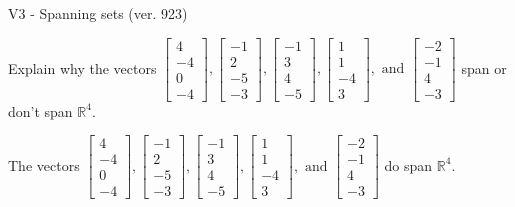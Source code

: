 \begin{exercise}
  \begin{exerciseTitle}V3 - Spanning sets (ver. 923)\end{exerciseTitle}
  \begin{exerciseStatement}
    Explain why the vectors \(\left[\begin{array}{r}
4 \\
-4 \\
0 \\
-4
\end{array}\right] , \left[\begin{array}{r}
-1 \\
2 \\
-5 \\
-3
\end{array}\right] , \left[\begin{array}{r}
-1 \\
3 \\
4 \\
-5
\end{array}\right] , \left[\begin{array}{r}
1 \\
1 \\
-4 \\
3
\end{array}\right] , \text{ and } \left[\begin{array}{r}
-2 \\
-1 \\
4 \\
-3
\end{array}\right]\) span or don't span \(\mathbb{R}^4\). 
	


  \end{exerciseStatement}
  \begin{exerciseAnswer}
   The vectors \(\left[\begin{array}{r}
4 \\
-4 \\
0 \\
-4
\end{array}\right] , \left[\begin{array}{r}
-1 \\
2 \\
-5 \\
-3
\end{array}\right] , \left[\begin{array}{r}
-1 \\
3 \\
4 \\
-5
\end{array}\right] , \left[\begin{array}{r}
1 \\
1 \\
-4 \\
3
\end{array}\right] , \text{ and } \left[\begin{array}{r}
-2 \\
-1 \\
4 \\
-3
\end{array}\right]\) 
  	 do  
	span \(\mathbb{R}^4\).
  



\end{exerciseAnswer}
\end{exercise}
